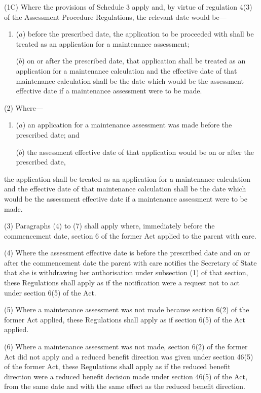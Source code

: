 \documentclass[12pt,a4paper]{article}
\begin{document}
(1C) Where the provisions of Schedule 3 apply and, by virtue of regulation 4(3) of the Assessment Procedure Regulations, the relevant date would be—
\begin{enumerate}\item[]
($a$) before the prescribed date, the application to be proceeded with shall be treated as an application for a maintenance assessment;

($b$) on or after the prescribed date, that application shall be treated as an application for a maintenance calculation and the effective date of that maintenance calculation shall be the date which would be the assessment effective date if a maintenance assessment were to be made.
\end{enumerate}

(2) Where—
\begin{enumerate}\item[]
($a$) an application for a maintenance assessment was made before the prescribed date; and

($b$) the assessment effective date of that application would be on or after the prescribed date,
\end{enumerate}
the application shall be treated as an application for a maintenance calculation and the effective date of that maintenance calculation shall be the date which would be the assessment effective date if a maintenance assessment were to be made.

(3) Paragraphs (4) to (7) shall apply where, 
immediately before  %
the commencement date, section 6 of the former Act applied to the parent with care.

(4) 
Where the assessment effective date  %
is before the prescribed date and on or after the commencement date the parent with care notifies the Secretary of State that she is withdrawing her authorisation under subsection (1) of that section, these Regulations shall apply as if the notification were a request not to act under section 6(5) of the Act.

(5) Where a maintenance assessment was not made because section 6(2) of the former Act applied, these Regulations shall apply as if section 6(5) of the Act applied.

(6) Where a maintenance assessment was not made, section 6(2) of the former Act did not apply and a reduced benefit direction was given under section 46(5) of the former Act, these Regulations shall apply as if the reduced benefit direction were a reduced benefit decision made under section 46(5) of the Act, from the same date and with the same effect as the reduced benefit direction.
\end{document}
